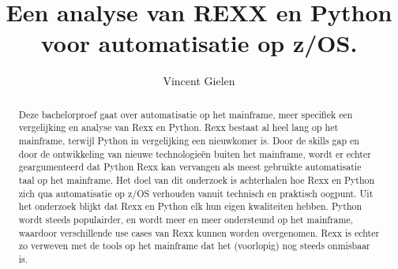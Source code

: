 \documentclass[a0,portrait]{hogent-poster}
\title{Een analyse van REXX en Python voor automatisatie op z/OS.}
\author{Vincent Gielen}
\begin{document}
\maketitle

\begin{abstract}
Deze bachelorproef gaat over automatisatie op het mainframe, meer specifiek een vergelijking en analyse van Rexx en Python. Rexx bestaat al heel lang op het mainframe, terwijl Python in vergelijking een nieuwkomer is. Door de skills gap en door de ontwikkeling van nieuwe technologieën buiten het mainframe, wordt er echter geargumenteerd dat Python Rexx kan vervangen als meest gebruikte automatisatie taal op het mainframe. Het doel van dit onderzoek is achterhalen hoe Rexx en Python zich qua automatisatie op z/OS verhouden vanuit technisch en praktisch oogpunt.  
Uit het onderzoek blijkt dat Rexx en Python elk hun eigen kwaliteiten hebben. Python wordt steeds populairder, en wordt meer en meer ondersteund op het mainframe, waardoor verschillende use cases van Rexx kunnen worden overgenomen. Rexx is echter zo verweven met de tools op het mainframe dat het (voorlopig) nog steeds onmisbaar is. 
\end{abstract}
\end{document}

